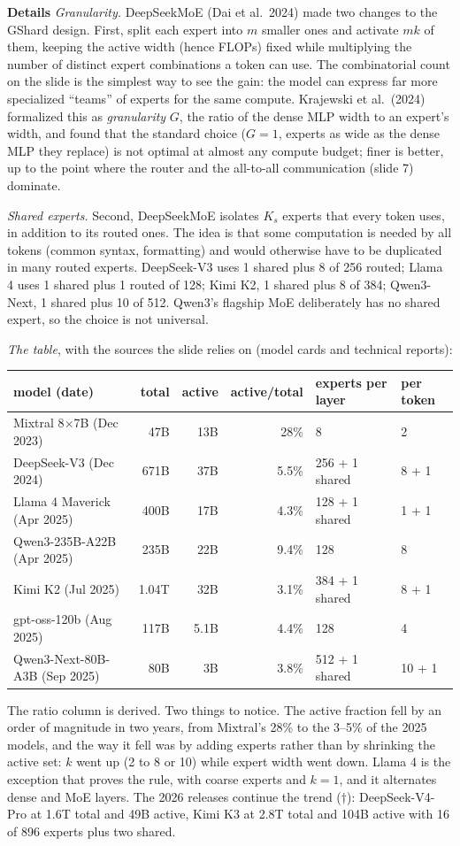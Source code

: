 \documentclass[11pt,letterpaper]{article}
\newcommand{\para}[1]{\medskip\noindent\textbf{#1}\quad}
\begin{document}
\para{Details} \emph{Granularity.} DeepSeekMoE (Dai et al.\ 2024) made two changes to the GShard design. First, split each expert into $m$ smaller ones and activate $mk$ of them, keeping the active width (hence FLOPs) fixed while multiplying the number of distinct expert combinations a token can use. The combinatorial count on the slide is the simplest way to see the gain: the model can express far more specialized ``teams'' of experts for the same compute. Krajewski et al.\ (2024) formalized this as \emph{granularity} $G$, the ratio of the dense MLP width to an expert's width, and found that the standard choice ($G=1$, experts as wide as the dense MLP they replace) is not optimal at almost any compute budget; finer is better, up to the point where the router and the all-to-all communication (slide 7) dominate.

\emph{Shared experts.} Second, DeepSeekMoE isolates $K_s$ experts that every token uses, in addition to its routed ones. The idea is that some computation is needed by all tokens (common syntax, formatting) and would otherwise have to be duplicated in many routed experts. DeepSeek-V3 uses 1 shared plus 8 of 256 routed; Llama 4 uses 1 shared plus 1 routed of 128; Kimi K2, 1 shared plus 8 of 384; Qwen3-Next, 1 shared plus 10 of 512. Qwen3's flagship MoE deliberately has no shared expert, so the choice is not universal.

\emph{The table}, with the sources the slide relies on (model cards and technical reports):
\begin{center}\small
\begin{tabular}{@{}lrrrll@{}}
\toprule
model (date) & total & active & active/total & experts per layer & per token\\
\midrule
Mixtral 8$\times$7B (Dec 2023) & 47B & 13B & 28\% & 8 & 2\\
DeepSeek-V3 (Dec 2024) & 671B & 37B & 5.5\% & 256 + 1 shared & 8 + 1\\
Llama 4 Maverick (Apr 2025) & 400B & 17B & 4.3\% & 128 + 1 shared & 1 + 1\\
Qwen3-235B-A22B (Apr 2025) & 235B & 22B & 9.4\% & 128 & 8\\
Kimi K2 (Jul 2025) & 1.04T & 32B & 3.1\% & 384 + 1 shared & 8 + 1\\
gpt-oss-120b (Aug 2025) & 117B & 5.1B & 4.4\% & 128 & 4\\
Qwen3-Next-80B-A3B (Sep 2025) & 80B & 3B & 3.8\% & 512 + 1 shared & 10 + 1\\
\bottomrule
\end{tabular}
\end{center}
The ratio column is derived. Two things to notice. The active fraction fell by an order of magnitude in two years, from Mixtral's 28\% to the 3--5\% of the 2025 models, and the way it fell was by adding experts rather than by shrinking the active set: $k$ went up (2 to 8 or 10) while expert width went down. Llama 4 is the exception that proves the rule, with coarse experts and $k=1$, and it alternates dense and MoE layers. The 2026 releases continue the trend ($\dagger$): DeepSeek-V4-Pro at 1.6T total and 49B active, Kimi K3 at 2.8T total and 104B active with 16 of 896 experts plus two shared.
\end{document}
